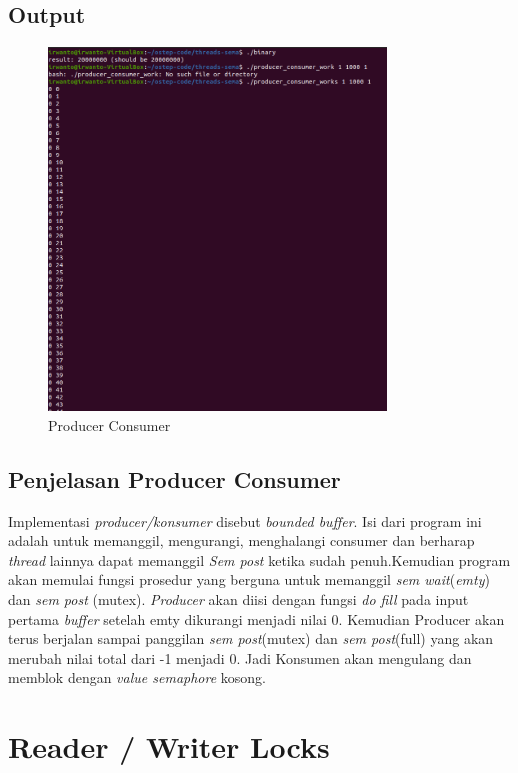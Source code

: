 \documentclass[11pt,a4paper]{article}
\begin{document}
\subsection{Output}
\begin{figure}[h]
    \centering
    \includegraphics[width=0.8\textwidth]{Figure/producer consumer.png}
    \caption{Producer Consumer}
    \label{fig:my_label}
\end{figure}

\subsection{Penjelasan Producer Consumer}
Implementasi \textit{producer/konsumer} disebut \textit{bounded buffer}. Isi dari program ini adalah untuk memanggil, mengurangi, menghalangi consumer dan berharap \textit{thread} lainnya dapat memanggil \textit{Sem post} ketika sudah penuh.Kemudian program akan memulai fungsi prosedur yang berguna untuk memanggil \textit{sem wait}(\textit{emty}) dan \textit{sem post} (mutex). \textit{Producer} akan diisi dengan fungsi \textit{do fill} pada input pertama \textit{buffer} setelah emty dikurangi menjadi nilai 0. Kemudian Producer akan terus berjalan sampai panggilan \textit{sem post}(mutex) dan \textit{sem post}(full) yang akan merubah nilai total dari -1 menjadi 0. Jadi Konsumen akan mengulang dan memblok dengan \textit{value semaphore} kosong.

\section{Reader / Writer Locks}
\end{document}
